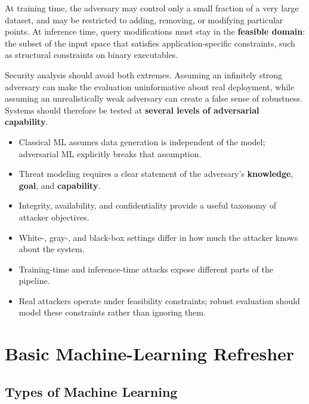 \documentclass[11pt,a4paper]{report}
\begin{document}
At training time, the adversary may control only a small fraction of a very large dataset, and may be restricted to adding, removing, or modifying particular points. At inference time, query modifications must stay in the \textbf{feasible domain}: the subset of the input space that satisfies application-specific constraints, such as structural constraints on binary executables.

\begin{warningbox}[title={Do not choose an unrealistic attacker}]
Security analysis should avoid both extremes. Assuming an infinitely strong adversary can make the evaluation uninformative about real deployment, while assuming an unrealistically weak adversary can create a false sense of robustness. Systems should therefore be tested at \textbf{several levels of adversarial capability}.
\end{warningbox}

\begin{takeawaybox}
\begin{itemize}
  \item Classical ML assumes data generation is independent of the model; adversarial ML explicitly breaks that assumption.
  \item Threat modeling requires a clear statement of the adversary's \textbf{knowledge}, \textbf{goal}, and \textbf{capability}.
  \item Integrity, availability, and confidentiality provide a useful taxonomy of attacker objectives.
  \item White-, gray-, and black-box settings differ in how much the attacker knows about the system.
  \item Training-time and inference-time attacks expose different parts of the pipeline.
  \item Real attackers operate under feasibility constraints; robust evaluation should model these constraints rather than ignoring them.
\end{itemize}
\end{takeawaybox}

\chapter{Basic Machine-Learning Refresher}

\section{Types of Machine Learning}
\end{document}
